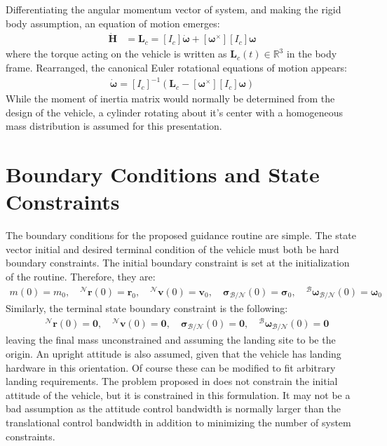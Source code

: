 \documentclass[conf]{new-aiaa}
\begin{document}
Differentiating the angular momentum vector of system, and making the rigid body assumption, an equation of motion emerges:
\begin{align}
\dot{\bm{H}} &= \mathbf{L}_c = [I_c]\dot{\boldsymbol{\omega}} + [\boldsymbol{\omega}^\times][I_c]\boldsymbol{\omega}
\end{align}
where the torque acting on the vehicle is written as $\mathbf{L}_c(t) \in \mathbb{R}^3$ in the body frame. Rearranged, the canonical Euler rotational equations of motion appears:
\begin{align}
	\dot{\boldsymbol{\omega}} = [I_c]^{-1}(\mathbf{L}_c - [\boldsymbol{\omega}^\times][I_c]\boldsymbol{\omega})
\end{align}
While the moment of inertia matrix would normally be determined from the design of the vehicle, a cylinder rotating about it's center with a homogeneous mass distribution is assumed for this presentation.


\section{Boundary Conditions and State Constraints}
The boundary conditions for the proposed guidance routine are simple. The state vector initial and desired terminal condition of the vehicle must both be hard boundary constraints. The initial boundary constraint is set at the initialization of the routine. Therefore, they are:
\begin{align}
	m(0) = m_0, \quad ^\mathcal{N}\mathbf{r}(0) = \mathbf{r}_0, \quad ^\mathcal{N}\mathbf{v}(0) = \mathbf{v}_0, \quad \boldsymbol{\sigma}_\mathcal{B/N}(0) = \boldsymbol{\sigma}_0, \quad  ^\mathcal{B}\boldsymbol{\omega}_\mathcal{B/N}(0) = \boldsymbol{\omega}_0
\end{align}
Similarly, the terminal state boundary constraint is the following:
\begin{align}
	\quad ^\mathcal{N}\mathbf{r}(0) = \mathbf{0}, \quad ^\mathcal{N}\mathbf{v}(0) = \mathbf{0}, \quad \boldsymbol{\sigma}_\mathcal{B/N}(0) = \mathbf{0}, \quad  ^\mathcal{B}\boldsymbol{\omega}_\mathcal{B/N}(0) = \mathbf{0}
\end{align}
leaving the final mass unconstrained and assuming the landing site to be the origin. An upright attitude is also assumed, given that the vehicle has landing hardware in this orientation. Of course these can be modified to fit arbitrary landing requirements. The problem proposed in \cite{szmuk2018successive} does not constrain the initial attitude of the vehicle, but it is constrained in this formulation. It may not be a bad assumption as the attitude control bandwidth is normally larger than the translational control bandwidth in addition to minimizing the number of system constraints.
\end{document}
